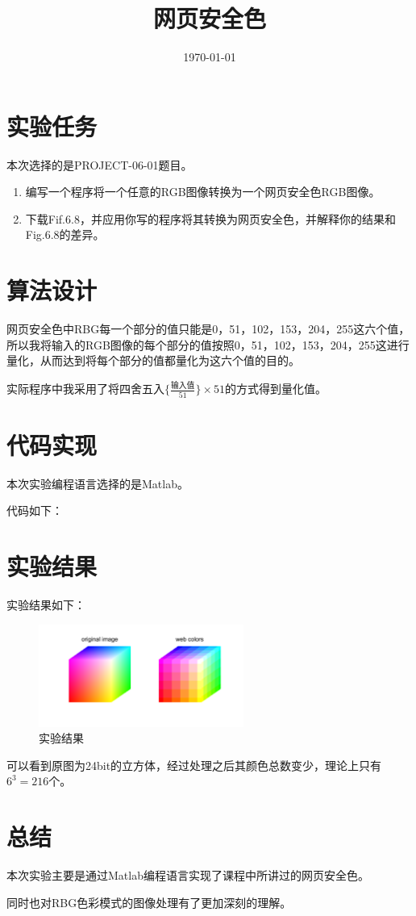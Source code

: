 \documentclass{../source/Experiment}
\title{网页安全色}
\date{\today}
\begin{document}
    \makecover
    \section{实验任务}
        本次选择的是PROJECT-06-01题目。
    

        \begin{enumerate}
            \item 编写一个程序将一个任意的RGB图像转换为一个网页安全色RGB图像。
            \item 下载Fif.6.8，并应用你写的程序将其转换为网页安全色，并解释你的结果和Fig.6.8的差异。
        \end{enumerate}
    \section{算法设计}
        
        网页安全色中RBG每一个部分的值只能是0，51，102，153，204，255这六个值，所以我将输入的RGB图像的每个部分的值按照0，51，102，153，204，255这进行量化，从而达到将每个部分的值都量化为这六个值的目的。

        实际程序中我采用了将$\mbox{四舍五入}\{ \frac{\mbox{输入值}}{51}\} \times 51$的方式得到量化值。

    \section{代码实现}
        本次实验编程语言选择的是Matlab。

        代码如下：

        

    \section{实验结果}
        实验结果如下：

        \begin{figure}[H]
            \centering
            \includegraphics[width = 0.6\textwidth]{第三次/f1.png}
            \caption{实验结果}
        \end{figure}

        可以看到原图为24bit的立方体，经过处理之后其颜色总数变少，理论上只有$6^3 = 216$个。

    \section{总结}
    本次实验主要是通过Matlab编程语言实现了课程中所讲过的网页安全色。

    同时也对RBG色彩模式的图像处理有了更加深刻的理解。
\end{document}
